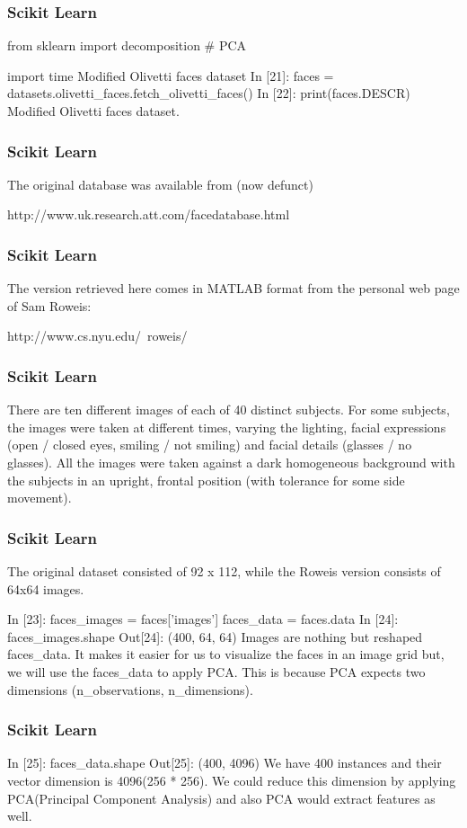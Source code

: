 \begin{frame}[fragile]
	\frametitle{Scikit Learn}
from sklearn import decomposition # PCA

import time
Modified Olivetti faces dataset
In [21]:
faces = datasets.olivetti_faces.fetch_olivetti_faces()
In [22]:
print(faces.DESCR)
Modified Olivetti faces dataset.
\end{frame}
\begin{frame}[fragile]
	\frametitle{Scikit Learn}
The original database was available from (now defunct)

    http://www.uk.research.att.com/facedatabase.html
\end{frame}
\begin{frame}[fragile]
	\frametitle{Scikit Learn}
The version retrieved here comes in MATLAB format from the personal
web page of Sam Roweis:

    http://www.cs.nyu.edu/~roweis/
\end{frame}
\begin{frame}[fragile]
	\frametitle{Scikit Learn}
There are ten different images of each of 40 distinct subjects. For some
subjects, the images were taken at different times, varying the lighting,
facial expressions (open / closed eyes, smiling / not smiling) and facial
details (glasses / no glasses). All the images were taken against a dark
homogeneous background with the subjects in an upright, frontal position (with
tolerance for some side movement).
\end{frame}
\begin{frame}[fragile]
	\frametitle{Scikit Learn}
The original dataset consisted of 92 x 112, while the Roweis version
consists of 64x64 images.


In [23]:
faces_images = faces['images']
faces_data = faces.data
In [24]:
faces_images.shape
Out[24]:
(400, 64, 64)
Images are nothing but reshaped faces_data. It makes it easier for us to visualize the faces in an image grid but, we will use the faces_data to apply PCA. This is because PCA expects two dimensions (n_observations, n_dimensions).
\end{frame}
\begin{frame}[fragile]
	\frametitle{Scikit Learn}
In [25]:
faces_data.shape
Out[25]:
(400, 4096)
We have 400 instances and their vector dimension is 4096(256 * 256). We could reduce this dimension by applying PCA(Principal Component Analysis) and also PCA would extract features as well.
\end{frame}

